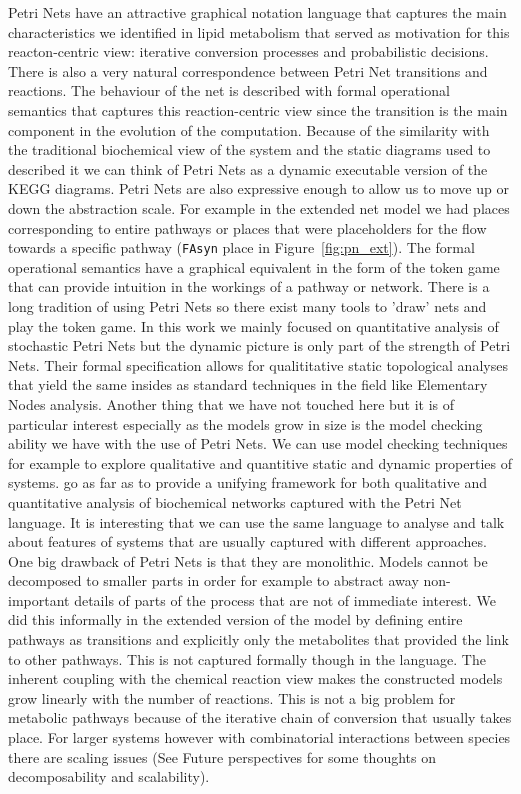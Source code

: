 Petri Nets have an attractive graphical notation language that
captures the main
characteristics we identified in lipid metabolism that served as
motivation for this reacton-centric view: iterative conversion
processes and probabilistic decisions. There is also a very natural
correspondence between Petri Net transitions and reactions. The
behaviour of the net is described with formal operational semantics
that captures this reaction-centric view since the transition is the
main component in the evolution of the computation. Because of the
similarity with the traditional biochemical view of the system and the
static diagrams used to described it we can think of Petri Nets as a
dynamic executable version of the KEGG diagrams. Petri Nets are also
expressive enough to allow us to move up or down the abstraction
scale. For example in the extended net model we had places
corresponding to entire pathways or places that were placeholders for
the flow towards a specific pathway (\texttt{FAsyn} place in
Figure~\ref{fig:pn_ext}). The formal operational semantics have a
graphical equivalent in the form of the token game that can provide
intuition in the workings of a pathway or network. There is a long
tradition of using Petri Nets so there exist many tools to 'draw' nets
and play the token game. In this work we mainly focused on
quantitative analysis of stochastic Petri Nets but the dynamic picture
is only part of the strength of Petri Nets. Their formal specification
allows for qualititative static topological analyses that yield the
same insides as standard techniques in the field like Elementary Nodes
analysis. Another thing that we have not touched here but it is of
particular interest especially as the models grow in size is the model
checking ability we have with the use of Petri Nets. We can use model
checking techniques for example to explore qualitative and quantitive
static and dynamic properties of systems. \citet{gilbert2007unifying}
go as far as to provide a unifying framework for both qualitative and
quantitative analysis of biochemical networks captured with the Petri
Net language. It is interesting that we can use the same language to
analyse and talk about features of systems that are usually captured
with different approaches. One big drawback of Petri Nets is that they
are monolithic. Models cannot be decomposed to smaller parts in order
for example to abstract away non-important details of parts of the
process that are not of immediate interest. We did this informally in
the extended version of the model by defining entire pathways as
transitions and explicitly only the metabolites that provided the link
to other pathways. This is not captured formally though in the
language. The inherent coupling with the chemical reaction view makes
the constructed models grow linearly with the number of
reactions. This is not a big problem for metabolic pathways because of
the iterative chain of conversion that usually takes place. For
larger systems however with combinatorial interactions between species
there are scaling issues (See Future perspectives for some thoughts on
decomposability and scalability).

